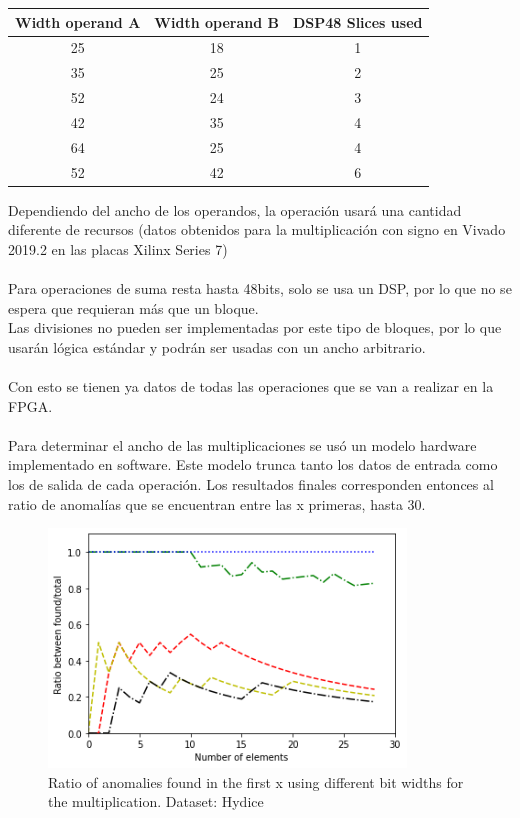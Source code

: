 \begin{center}
 \begin{tabular}{|c c |c|} 
 \hline
 Width operand A & Width operand B & DSP48 Slices used \\ [0.5ex] 
 \hline\hline
 25 & 18 & 1 \\ 
 \hline
 35 & 25 & 2 \\
 \hline
 52 & 24 & 3 \\
 \hline
 42 & 35 & 4 \\
 \hline
 64 & 25 & 4 \\
 \hline
 52 & 42 & 6 \\
 \hline
\end{tabular}
\end{center}
Dependiendo del ancho de los operandos, la operación usará una cantidad diferente de recursos (datos obtenidos para la multiplicación con signo en Vivado 2019.2 en las placas Xilinx Series 7)
\\
\\
Para operaciones de suma resta hasta 48bits, solo se usa un DSP, por lo que no se espera que requieran más que un bloque.
\\
Las divisiones no pueden ser implementadas por este tipo de bloques, por lo que usarán lógica estándar y podrán ser usadas con un ancho arbitrario.
\\
\\
Con esto se tienen ya datos de todas las operaciones que se van a realizar en la FPGA.
\\
\\
Para determinar el ancho de las multiplicaciones se usó un modelo hardware implementado en software. Este modelo trunca tanto los datos de entrada como los de salida de cada operación. Los resultados finales corresponden entonces al ratio de anomalías que se encuentran entre las x primeras, hasta 30.
\begin{figure}[h!]
\centering
\includegraphics[height=2.5in]{figures/width.png}
\caption{Ratio of anomalies found in the first x using different bit widths for the multiplication. Dataset: Hydice}
  \label{fig:width}
\end{figure}

